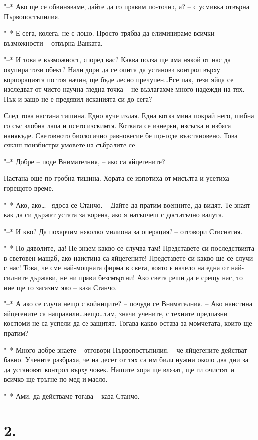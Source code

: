 \documentclass[ebook,openany,12pt]{memoir}
\begin{document}
"--* Ако ще се обвиняваме, дайте да го правим по-точно, а? – с усмивка отвърна Първопостъпилия.

"--* Е сега, колега, не с лошо. Просто трябва да елиминираме всички възможности – отвърна Ванката.

"--* И това е възможност, според вас? Каква полза ще има някой от нас да окупира този обект? Нали дори да се опита да установи контрол върху корпорацията по тоя начин, ще бъде лесно пречупен\ldots Все пак, тези яйца се изследват от чисто научна гледна точка – не възлагахме много надежди на тях. Пък и защо не е предявил исканията си до сега?

След това настана тишина. Едно куче излая. Една котка мина покрай него, шибна го със злобна лапа и псето изскимтя. Котката се изнерви, изсъска и избяга нанякъде. Световното биологично равновесие бе що-годе възстановено. Това сякаш поизбистри умовете на събралите се.

"--* Добре -- поде Внимателния, – ако са яйцегените?

Настана още по-гробна тишина. Хората се изпотиха от мисълта и усетиха горещото време.

"--* Ако, ако\ldots -- ядоса се Станчо. – Дайте да пратим военните, да видят. Те знаят как да си държат устата затворена, ако я натъпчеш с достатъчно валута. 

"--* И кво? Да похарчим няколко милиона за операция? – отговори Стиснатия.

"--* По дяволите, да! Не знаем какво се случва там! Представете си последствията в световен мащаб, ако наистина са яйцегените! Представете си какво ще се случи с нас! Това, че сме най-мощната фирма в света, която е начело на една от най-силните държави, не ни прави безсмъртни! Ако света реши да е срещу нас, то ние ще го загазим яко – каза Станчо.

"--* А ако се случи нещо с войниците? – почуди се Внимателния. – Ако наистина яйцегените са направили\ldots нещо\ldots там, значи учените, с техните предпазни костюми не са успели да се защитят. Тогава какво остава за момчетата, които ще пратим?

"--* Много добре знаете – отговори Първопостъпилия, – че яйцегените действат бавно. Учените разбраха, че на десет от тях са им били нужни около два дни за да установят контрол върху човек. Нашите хора ще влязат, ще ги очистят и всичко ще тръгне по мед и масло. 

"--* Ами, да действаме тогава -- каза Станчо.

\section*{2.}
\end{document}
